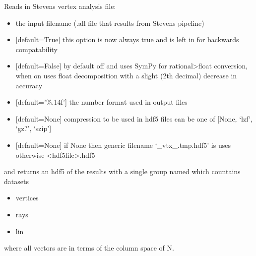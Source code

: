 \documentclass[letterpaper,10pt,english]{sphinxmanual}
\begin{document}
\begin{fulllineitems}
\label{\detokenize{modules_doc:cbmpy.CBRead.readSK_vertex}}
\pysigstartsignatures
{}
\pysigstopsignatures
\sphinxAtStartPar
Reads in Stevens vertex analysis file:
\begin{itemize}
\item {} 
\sphinxAtStartPar
{} the input filename (.all file that results from Stevens pipeline)

\item {} 
\sphinxAtStartPar
{} {[}default=True{]} this option is now always true and is left in for backwards compatability

\item {} 
\sphinxAtStartPar
{} {[}default=False{]} by default off and uses SymPy for rational\textendash{}\textgreater{}float conversion, when on uses float decomposition with a slight (2th decimal) decrease in accuracy

\item {} 
\sphinxAtStartPar
{} {[}default=’\%.14f’{]} the number format used in output files

\item {} 
\sphinxAtStartPar
{} {[}default=None{]} compression to be used in hdf5 files can be one of {[}None, ‘lzf’, ‘gz?’, ‘szip’{]}

\item {} 
\sphinxAtStartPar
{} {[}default=None{]} if None then generic filename ‘\_vtx\_.tmp.hdf5’ is uses otherwise \textless{}hdf5file\textgreater{}.hdf5

\end{itemize}

\sphinxAtStartPar
and returns an hdf5  of the results with a single group named  which countains datasets
\begin{itemize}
\item {} 
\sphinxAtStartPar
vertices

\item {} 
\sphinxAtStartPar
rays

\item {} 
\sphinxAtStartPar
lin

\end{itemize}

\sphinxAtStartPar
where all vectors are in terms of the column space of N.

\end{fulllineitems}
\end{document}
